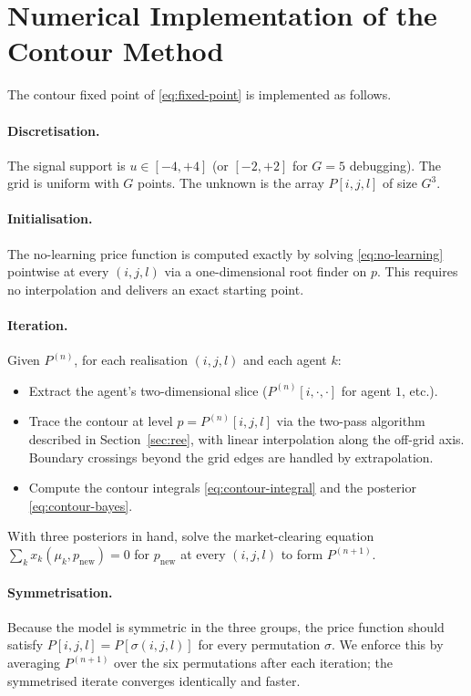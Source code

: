 \documentclass[12pt,letterpaper]{article}
\theoremstyle{definition}
\theoremstyle{remark}
\newcommand{\1}{\mathbf{1}}
\begin{document}
\section{Numerical Implementation of the Contour Method}\label{app:contour}\label{app:numerics}

The contour fixed point of \eqref{eq:fixed-point} is implemented as follows.

\paragraph{Discretisation.} The signal support is $u\in[-4,+4]$ (or $[-2,+2]$
for $G=5$ debugging). The grid is uniform with $G$ points. The unknown is
the array $P[i,j,l]$ of size $G^{3}$.

\paragraph{Initialisation.} The no-learning price function is computed
exactly by solving \eqref{eq:no-learning} pointwise at every $(i,j,l)$ via
a one-dimensional root finder on $p$. This requires no interpolation and
delivers an exact starting point.

\paragraph{Iteration.} Given $P^{(n)}$, for each realisation $(i,j,l)$ and
each agent $k$:
\begin{itemize}[topsep=2pt,itemsep=2pt]
   \item Extract the agent's two-dimensional slice
         ($P^{(n)}[i,\cdot,\cdot]$ for agent $1$, etc.).
   \item Trace the contour at level $p=P^{(n)}[i,j,l]$ via the two-pass
         algorithm described in Section~\ref{sec:ree}, with linear
         interpolation along the off-grid axis. Boundary crossings beyond
         the grid edges are handled by extrapolation.
   \item Compute the contour integrals \eqref{eq:contour-integral} and
         the posterior \eqref{eq:contour-bayes}.
\end{itemize}
With three posteriors in hand, solve the market-clearing equation
$\sum_{k}x_{k}(\mu_{k},p_{\text{new}})=0$ for $p_{\text{new}}$ at every
$(i,j,l)$ to form $P^{(n+1)}$.

\paragraph{Symmetrisation.} Because the model is symmetric in the three
groups, the price function should satisfy $P[i,j,l]=P[\sigma(i,j,l)]$ for
every permutation $\sigma$. We enforce this by averaging $P^{(n+1)}$ over
the six permutations after each iteration; the symmetrised iterate
converges identically and faster.
\end{document}
